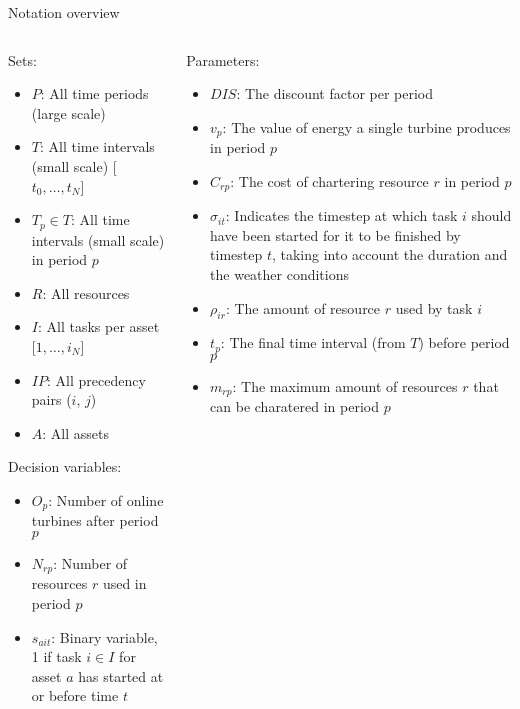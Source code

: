 \documentclass{beamer}
\begin{document}
\begin{frame}{Notation overview}
\scriptsize

\begin{columns}
\begin{column}{.48\textwidth}
Sets:
\begin{itemize}
\item $P$: All time periods (large scale)
\item $T$: All time intervals (small scale) [$t_0, \dots , t_N$]
\item $T_p \in T$: All time intervals (small scale) in period $p$
\item $R$: All resources
\item $I$:  All tasks per asset [$1, \dots , i_N$]
\item $IP$: All precedency pairs ($i$, $j$)
\item $A$: All assets
\end{itemize}

Decision variables:
\begin{itemize}
\item $O_{p}$: Number of online turbines after period $p$
\item $N_{rp}$: Number of resources $r$ used in period $p$
\item $s_{ait}$: Binary variable, 1 if task $i \in I$ for asset $a$ has started at or before time $t$
\end{itemize}
\end{column}

\hfill

\begin{column}{.48\textwidth}
Parameters:
\begin{itemize}
\item $DIS$: The discount factor per period
\item $v_p$: The value of energy a single turbine produces in period $p$
\item $C_{rp}$: The cost of chartering resource $r$ in period $p$
\item $\sigma_{it}$: Indicates the timestep at which task $i$ should have been started for it to be finished by timestep $t$, taking into account the duration and the weather conditions
\item $\rho_{ir}$: The amount of resource $r$ used by task $i$
\item $t_p$: The final time interval (from $T$) before period $p$
\item $m_{rp}$: The maximum amount of resources $r$ that can be charatered in period $p$
\end{itemize}
\end{column}
\end{columns}

\end{frame}
\end{document}
